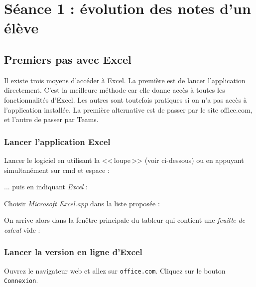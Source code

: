 \newpage


\section{Séance 1 : évolution des notes d'un élève}


\subsection{Premiers pas avec Excel}

Il existe trois moyens d'accéder à Excel. La première est de lancer l'application directement. C'est la meilleure méthode car elle donne accès à toutes les fonctionnalités d'Excel. Les autres sont toutefois pratiques si on n'a pas accès à l'application installée. La première alternative est de passer par le site office.com, et l'autre de passer par Teams.

\subsubsection{Lancer l'application Excel}

Lancer le logiciel en utilisant la <<\,loupe\,>> (voir ci-dessous) ou en appuyant simultanément sur cmd et espace :


... puis en indiquant \emph{Excel} :


Choisir \emph{Microsoft Excel.app} dans la liste proposée :


On arrive alors dans la fenêtre principale du tableur qui contient une \emph{feuille de calcul} vide :


\subsubsection{Lancer la version en ligne d'Excel}

Ouvrez le navigateur web et allez sur \texttt{office.com}. Cliquez sur le bouton \texttt{Connexion}.


